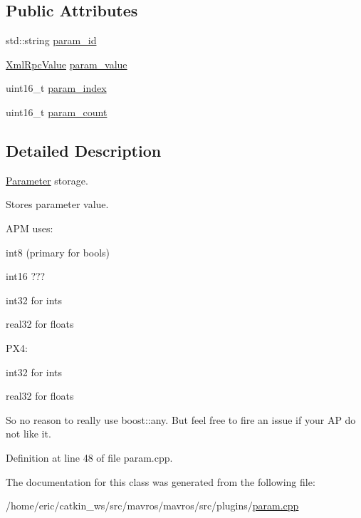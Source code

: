 \subsection*{Public Attributes}
\begin{DoxyCompactItemize}
\item 
std\+::string \mbox{\hyperlink{group__plugin_ga6e9b1d000a31b2ca2773ff03c28980da}{param\+\_\+id}}
\item 
\mbox{\hyperlink{group__plugin_gafe570e1ad21e55964c02084e1a485c92}{Xml\+Rpc\+Value}} \mbox{\hyperlink{group__plugin_ga91eae662f2d0f3b1a796940ab770c9f2}{param\+\_\+value}}
\item 
uint16\+\_\+t \mbox{\hyperlink{group__plugin_ga531408831574f2bcf7311ddae08a1b1e}{param\+\_\+index}}
\item 
uint16\+\_\+t \mbox{\hyperlink{group__plugin_ga962048d830e7dea388e9c9956e1a5b1b}{param\+\_\+count}}
\end{DoxyCompactItemize}


\subsection{Detailed Description}
\mbox{\hyperlink{classmavros_1_1std__plugins_1_1Parameter}{Parameter}} storage. 

Stores parameter value.

A\+PM uses\+:
\begin{DoxyItemize}
\item int8 (primary for bools)
\item int16 ???
\item int32 for int\textquotesingle{}s
\item real32 for float\textquotesingle{}s
\end{DoxyItemize}

P\+X4\+:
\begin{DoxyItemize}
\item int32 for int\textquotesingle{}s
\item real32 for float\textquotesingle{}s
\end{DoxyItemize}

So no reason to really use boost\+::any. But feel free to fire an issue if your AP do not like it. 

Definition at line 48 of file param.\+cpp.



The documentation for this class was generated from the following file\+:\begin{DoxyCompactItemize}
\item 
/home/eric/catkin\+\_\+ws/src/mavros/mavros/src/plugins/\mbox{\hyperlink{param_8cpp}{param.\+cpp}}\end{DoxyCompactItemize}
